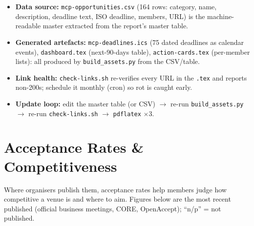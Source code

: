 \documentclass[11pt,a4paper]{article}
\begin{document}
\begin{itemize}[leftmargin=1.4em]
  \item \textbf{Data source:} \texttt{mcp-opportunities.csv} (164 rows: category, name, description, deadline text, ISO deadline, members, URL) is the machine-readable master extracted from the report's master table.
  \item \textbf{Generated artefacts:} \texttt{mcp-deadlines.ics} (75 dated deadlines as calendar events), \texttt{dashboard.tex} (next-90-days table), \texttt{action-cards.tex} (per-member lists): all produced by \texttt{build\_assets.py} from the CSV/table.
  \item \textbf{Link health:} \texttt{check-links.sh} re-verifies every URL in the \texttt{.tex} and reports non-200s; schedule it monthly (cron) so rot is caught early.
  \item \textbf{Update loop:} edit the master table (or CSV) $\rightarrow$ re-run \texttt{build\_assets.py} $\rightarrow$ re-run \texttt{check-links.sh} $\rightarrow$ \texttt{pdflatex} $\times$3.
\end{itemize}

\section{Acceptance Rates \& Competitiveness}

\noindent Where organisers publish them, acceptance rates help members judge how competitive a venue is and where to aim. Figures below are the most recent published (official business meetings, CORE, OpenAccept); ``n/p'' = not published.
\end{document}
